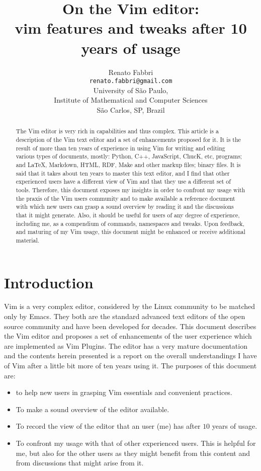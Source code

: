 \documentclass{article}
\begin{document}
\title{On the Vim editor:\\
vim features and tweaks after 10 years of usage}

\author{Renato Fabbri\\
\texttt{renato.fabbri@gmail.com}\\
University of São Paulo,\\
Institute of Mathematical and Computer Sciences\\
São Carlos, SP, Brazil
}
\maketitle
\begin{abstract}
The Vim editor is very rich in capabilities
and thus complex.
This article is a description of the Vim text editor
and a set of enhancements proposed for it.
It is the result of more than ten years of experience
in using Vim for writing and editing various types of documents,
mostly:
Python, C++, JavaScript, ChucK, etc, programs;
and \LaTeX, Markdown, HTML, RDF, Make and other markup files;
binary files.
It is said that it takes about ten years to master this
text editor, and I find that other experienced users
have a different view of Vim and that they use a different
set of tools.
Therefore, this document exposes my insights in order
to confront my usage with the praxis of the Vim users community
and to make available a reference document with which new users
can grasp a sound overview by reading it and the discussions that
it might generate.
Also, it should be useful for users of any degree of experience,
including me, as a compendium of commands, namespaces and tweaks.
Upon feedback, and maturing of my Vim usage,
this document might be enhanced or receive additional
material.
\end{abstract}

\section{Introduction}
Vim is a very complex editor,
considered by the Linux community to be
matched only by Emacs.
They both are the standard advanced text editors
of the open source community
and have been developed for decades.
This document describes the Vim editor
and proposes a set of enhancements of the user
experience which
are implemented as Vim Plugins.
The editor has a very mature documentation
and the contents herein presented is a
report on the overall understandings I
have of Vim after a little bit more
of ten years using it.
The purposes of this document are:
\begin{itemize}
  \item to help new users in grasping Vim essentials
  and convenient practices.
  \item To make a sound overview of the editor available.
  \item To record the view of the editor that
  an user (me) has after $10$ years of usage.
  \item To confront my usage with that of other experienced
  users. This is helpful for me, but also for the other users
  as they might benefit from this content and from discussions
  that might arise from it.
\end{itemize}
\end{document}
